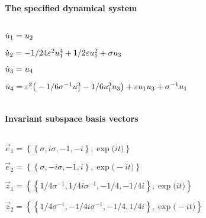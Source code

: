 
\(\)
\paragraph{The specified dynamical system}
\(
\)\par

\(\dot u_{1}=u\sb2
\)\par

\(\dot u_{2}=-1/24 \varepsilon^{2} u\sb1^{4}+1/2 \varepsilon u\sb1^{2}+\sigma  u\sb3
\)\par

\(\dot u_{3}=u\sb4
\)\par

\(\dot u_{4}=\varepsilon^{2} \big(-1/6 \sigma ^{-1} u\sb1^{3}-1/6 u\sb1^{3} u\sb3
\big)+\varepsilon u\sb1 u\sb3+\sigma ^{-1} u\sb1
\)\par

\(\)
\paragraph{Invariant subspace basis vectors}
\(
\)\par

\(\vec e_{1}=\left\{
\left\{
\sigma  , i \sigma  , -1 , -i
\right\} , \exp \big(i t\big)
\right\}
\)\par

\(\vec e_{2}=\left\{
\left\{
\sigma  , -i \sigma  , -1 , i
\right\} , \exp \big(-i t\big)
\right\}
\)\par

\(\vec z_{1}=\left\{
\left\{
1/4 \sigma ^{-1} , 1/4 i \sigma ^{-1} , -1/4 , -1/4 i
\right\} , \exp 
\big(i t\big)
\right\}
\)\par

\(\vec z_{2}=\left\{
\left\{
1/4 \sigma ^{-1} , -1/4 i \sigma ^{-1} , -1/4 , 1/4 i
\right\} , \exp 
\big(-i t\big)
\right\}
\)\par
